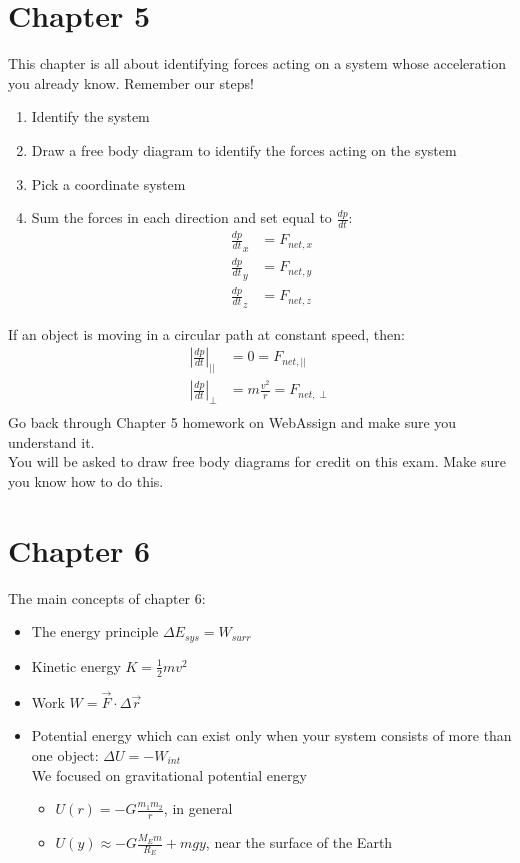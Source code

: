 \documentclass{article}
\begin{document}
\section*{Chapter 5}
	This chapter is all about identifying forces acting on a system whose acceleration you already know. Remember our steps!
	\begin{enumerate}
		\item Identify the system
		\item Draw a free body diagram to identify the forces acting on the system
		\item Pick a coordinate system
		\item Sum the forces in each direction and set equal to $\frac{dp}{dt}$:
		\begin{align*}
			\frac{dp}{dt}_x&=F_{net,x}\\
			\frac{dp}{dt}_y&=F_{net,y}\\
			\frac{dp}{dt}_z&=F_{net,z}
		\end{align*}
	\end{enumerate}
	If an object is moving in a circular path at constant speed, then:
	\begin{align*}
		\left|\frac{dp}{dt}\right|_{||}&=0=F_{net,||}\\
		\left|\frac{dp}{dt}\right|_{\perp}&=m\frac{v^2}{r}=F_{net,\perp}\\
	\end{align*}
	Go back through Chapter 5 homework on WebAssign and make sure you understand it.\\
	You will be asked to draw free body diagrams for credit on this exam. Make sure you know how to do this.
	
	\section*{Chapter 6}
	The main concepts of chapter 6:
	\begin{itemize}
		\item The energy principle $\Delta E_{sys}=W_{surr}$
		\item Kinetic energy $K=\frac{1}{2}mv^2$
		\item Work $W=\vec{F}\cdot\Delta \vec{r}$
		\item Potential energy which can exist only when your system consists of more than one object: $\Delta U = -W_{int}$\\ We focused on gravitational potential energy
		\begin{itemize}
			\item[] $U(r)=-G\frac{m_1m_2}{r}$, in general
			\item[] $U(y)\approx-G\frac{M_Em}{R_E}+mgy$, near the surface of the Earth
		\end{itemize}
	\end{itemize}
\end{document}
